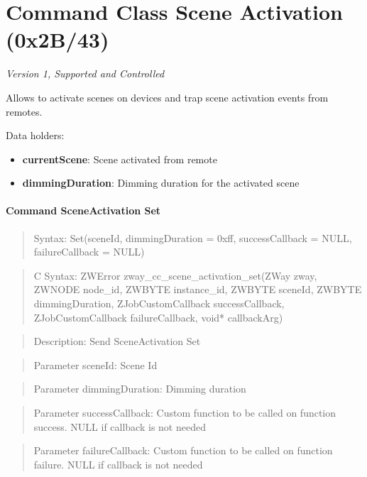 \section{Command Class Scene Activation (0x2B/43)}

\textit{Version 1, Supported and Controlled}
\newline

Allows to activate scenes on devices and trap scene activation events from remotes.
\newline

\noindent
Data holders:

\begin{itemize}
\item \textbf{currentScene}: Scene activated from remote
\item \textbf{dimmingDuration}: Dimming duration for the activated scene
\end{itemize}

\paragraph{Command SceneActivation Set}
\begin{quote}Syntax: Set(sceneId, dimmingDuration = 0xff, successCallback = NULL, failureCallback = NULL)\end{quote}
\begin{quote}C Syntax: ZWError zway\_cc\_scene\_activation\_set(ZWay zway, ZWNODE node\_id, ZWBYTE instance\_id, ZWBYTE sceneId, ZWBYTE dimmingDuration, ZJobCustomCallback successCallback, ZJobCustomCallback failureCallback, void* callbackArg)\end{quote}
\begin{quote}Description: Send SceneActivation Set\end{quote}
\begin{quote}Parameter sceneId: Scene Id\end{quote}
\begin{quote}Parameter dimmingDuration: Dimming duration\end{quote}
\begin{quote}Parameter successCallback: Custom function to be called on function success. NULL if callback is not needed\end{quote}
\begin{quote}Parameter failureCallback: Custom function to be called on function failure. NULL if callback is not needed\end{quote}



